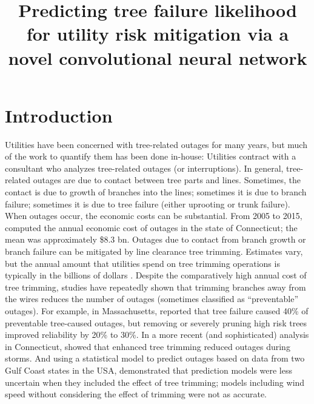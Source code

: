 \documentclass[11pt,twoside]{article}
\numberwithin{equation}{section}
\newcommand{\?}{\stackrel{?}{=}}
\begin{document}
\title{Predicting tree failure likelihood for utility risk mitigation via a novel convolutional neural network}
\date{}
\maketitle


\section{Introduction}
Utilities have been concerned with tree-related outages for many years, but much of the work to quantify them has been
done in-house: Utilities contract with a consultant who analyzes tree-related outages (or interruptions). In general,
tree-related outages are due to contact between tree parts and lines. Sometimes, the contact is due to growth of
branches into the lines; sometimes it is due to branch failure; sometimes it is due to tree failure (either uprooting or
trunk failure). When outages occur, the economic costs can be substantial. From 2005 to 2015, \cite{graziano2020wider}
computed the annual economic cost of outages in the state of Connecticut; the mean was approximately \$8.3 bn.  Outages
due to contact from branch growth or branch failure can be mitigated by line clearance tree trimming. Estimates vary,
but the annual amount that utilities spend on tree trimming operations is typically in the billions of dollars
\cite{guggenmoos2003effects}. Despite the comparatively high annual cost of tree trimming, studies have repeatedly shown
that trimming branches away from the wires reduces the number of outages (sometimes classified as “preventable”
outages). For example, in Massachusetts, \citet{simpson1996treecaused} reported that tree failure caused 40\% of
preventable tree-caused outages, but removing or severely pruning high risk trees improved reliability by 20\% to
30\%. In a more recent (and sophisticated) analysis in Connecticut, \citet{parent2019analysis} showed that enhanced tree
trimming reduced outages during storms. And using a statistical model to predict outages based on data from two Gulf
Coast states in the USA, \citet{nateghi2014power} demonstrated that prediction models were less uncertain when they
included the effect of tree trimming; models including wind speed without considering the effect of trimming were not as
accurate.
\end{document}
